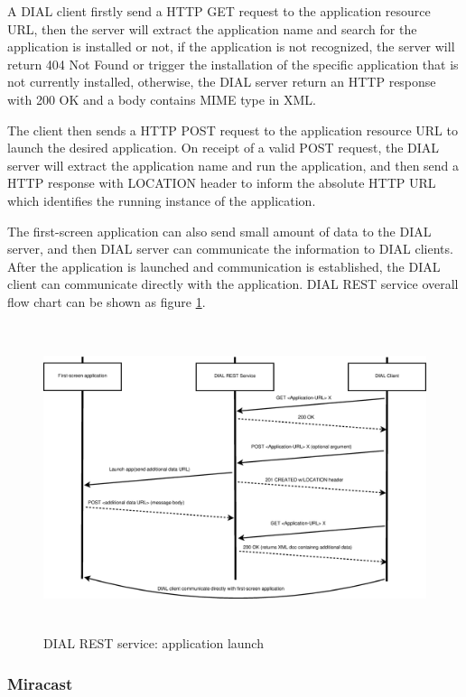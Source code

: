 \begin{enumerate}
A DIAL client firstly send a HTTP GET request to the application resource URL,
then the server will extract the application name and search for the
application is installed or not, if the application is not recognized, the
server will return 404 Not Found or trigger the installation of the specific
application that is not currently installed, otherwise, the DIAL server return
an HTTP response with 200 OK and a body contains MIME type in XML.

The client then sends a HTTP POST request to the application resource URL to
launch the desired application. On receipt of a valid POST request, the DIAL
server will extract the application name and run the application, and then send
a HTTP response with LOCATION header to inform the absolute HTTP URL which
identifies the running instance of the application.

The first-screen application can also send small amount of data to the DIAL
server, and then DIAL server can communicate the information to DIAL clients.
After the application is launched and communication is established, the DIAL
client can communicate directly with the application. DIAL REST service overall
flow chart can be shown as figure \ref{dial_rest}.

\begin{figure}[htb] \centering \includegraphics[height=9cm]{charts/dial_rest}
\caption{DIAL REST service: application launch \label{dial_rest}}
\end{figure}
\end{enumerate}

\subsubsection{Miracast}

